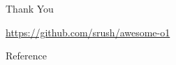\documentclass[14pt,aspectratio=169]{beamer}
\begin{document}
\begin{frame}
	\begin{center}
		Thank You
	\end{center}

	\vspace{0.5cm}
	\begin{center}
		\url{https://github.com/srush/awesome-o1}
	\end{center}
\end{frame}

\begin{frame}[allowframebreaks]{Reference}
	\begin{footnotesize}
		
		
	\end{footnotesize}
\end{frame}
\end{document}
